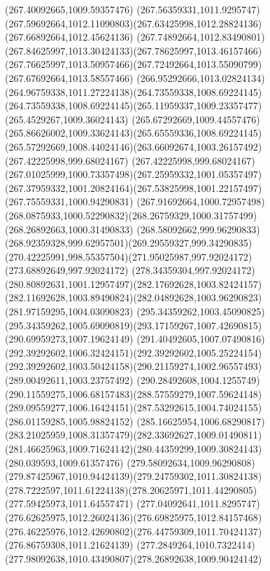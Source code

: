 {{		\lineto(267.40092665,1009.59357476)
		\lineto(267.56359331,1011.9295747)
		\curveto(267.59692664,1012.11090803)(267.63425998,1012.28824136)(267.66892664,1012.45624136)
		\curveto(267.74892664,1012.83490801)(267.84625997,1013.30424133)(267.78625997,1013.46157466)
		\curveto(267.76625997,1013.50957466)(267.72492664,1013.55090799)(267.67692664,1013.58557466)
		\curveto(266.95292666,1013.02824134)(264.96759338,1011.27224138)(264.73559338,1008.69224145)
		\curveto(264.73559338,1008.69224145)(265.11959337,1009.23357477)(265.4529267,1009.36024143)
		\curveto(265.67292669,1009.44557476)(265.86626002,1009.33624143)(265.65559336,1008.69224145)
		\curveto(265.57292669,1008.44024146)(263.66092674,1003.26157492)(267.42225998,999.68024167)
		\curveto(267.42225998,999.68024167)(267.01025999,1000.73357498)(267.25959332,1001.05357497)
		\curveto(267.37959332,1001.20824164)(267.53825998,1001.22157497)(267.75559331,1000.94290831)
		\curveto(267.91692664,1000.72957498)(268.0875933,1000.52290832)(268.26759329,1000.31757499)
		\lineto(268.26892663,1000.31490833)
		\curveto(268.58092662,999.96290833)(268.92359328,999.62957501)(269.29559327,999.34290835)
		\curveto(270.42225991,998.55357504)(271.95025987,997.92024172)(273.68892649,997.92024172)
		\curveto(278.34359304,997.92024172)(280.80892631,1001.12957497)(282.17692628,1003.82424157)
		\curveto(282.11692628,1003.89490824)(282.04892628,1003.96290823)(281.97159295,1004.03090823)
		\moveto(295.34359262,1003.45090825)
		\curveto(295.34359262,1005.69090819)(293.17159267,1007.42690815)(290.69959273,1007.19624149)
		\curveto(291.40492605,1007.07490816)(292.39292602,1006.32424151)(292.39292602,1005.25224154)
		\curveto(292.39292602,1003.50424158)(290.21159274,1002.96557493)(289.00492611,1003.23757492)
		\curveto(290.28492608,1004.1255749)(290.11559275,1006.68157483)(288.57559279,1007.59624148)
		\curveto(289.09559277,1006.16424151)(287.53292615,1004.74024155)(286.01159285,1005.98824152)
		\curveto(285.16625954,1006.68290817)(283.21025959,1008.31357479)(282.33692627,1009.01490811)
		\curveto(281.46625963,1009.71624142)(280.44359299,1009.30824143)(280.039593,1009.61357476)
		\curveto(279.58092634,1009.96290808)(279.87425967,1010.94424139)(279.24759302,1011.30824138)
		\curveto(278.7222597,1011.61224138)(278.20625971,1011.44290805)(277.59425973,1011.64557471)
		\curveto(277.04092641,1011.8295747)(276.62625975,1012.26024136)(276.69825975,1012.84157468)
		\curveto(276.46225976,1012.42690802)(276.44759309,1011.70424137)(276.86759308,1011.21624139)
		\curveto(277.2849264,1010.7322414)(277.98092638,1010.43490807)(278.26892638,1009.90424142)
}}
